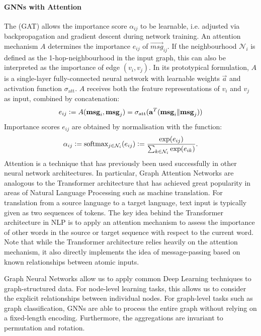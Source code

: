\documentclass[
	fontsize=10pt, %
	twoside=false, %
	secnumdepth=1, %
  toc=indentunnumbered %
]{kaobook}
\begin{document}
\paragraph{GNNs with Attention} The  (GAT)
\cite{velickovic_graph_2018} allows the importance score $\alpha_{ij}$ to be learnable, i.e.
adjusted via backpropagation and gradient descent during network training. An
attention mechanism $A$ determines the importance $e_{ij}$ of $\vec{msg}_{ij}$.
If the neighbourhood $\mathcal{N}_i$ is defined as the 1-hop-neighbourhood in
the input graph, this can also be interpreted as the importance of edge $(v_i,
v_j)$. In its prototypical formulation, $A$ is a single-layer fully-connected
neural network with learnable weights $\vec a$ and activation function
$\sigma_{\text{att}}$. $A$ receives
both the feature representations of $v_i$ and $v_j$ as input, combined by
concatenation:
\begin{align}
  e_{ij} := A(\mathbf{msg}_i, \mathbf{msg}_j) = \sigma_{\text{att}}(\mathbf{a}^T( \mathbf{msg}_i \| \mathbf{msg}_j))
  \label{eq:graph-attention}
\end{align}
Importance scores $e_{ij}$ are obtained by normalisation with the  function:
\begin{align}
  \alpha_{ij} := \text{softmax}_{j \in \mathcal{N}_i}(e_{ij}) := \frac{\exp(e_{ij})}{\sum_{k \in \mathcal{N}_i} \exp(e_{ik})}.
  \label{eq:softmax}
\end{align}
Attention is a technique that has previously been used successfully in other
neural network architectures. In particular, Graph Attention Networks are
analogous to the Transformer architecture \cite{vaswani_AttentionAllYou_2017}
that has achieved great popularity in areas of Natural Language
Processing such as machine translation.
For translation from a source language
to a target language, text input is typically given as two sequences of tokens.
The key idea behind the Transformer architecture in NLP is to apply an attention
mechanism to assess the importance of other words in the source or target
sequence with respect to the current word.
Note that while the Transformer architecture relies heavily on the attention
mechanism, it also directly implements the idea of message-passing based on
known relationships between atomic inputs.

Graph Neural Networks allow us to apply common Deep Learning techniques to
graph-structured data. For node-level learning tasks, this allows us to consider
the explicit relationships between individual nodes. For graph-level tasks such
as graph classification, GNNs are able to process the entire graph without
relying on a fixed-length encoding. Furthermore, the aggregations are invariant
to permutation and rotation.
\end{document}
